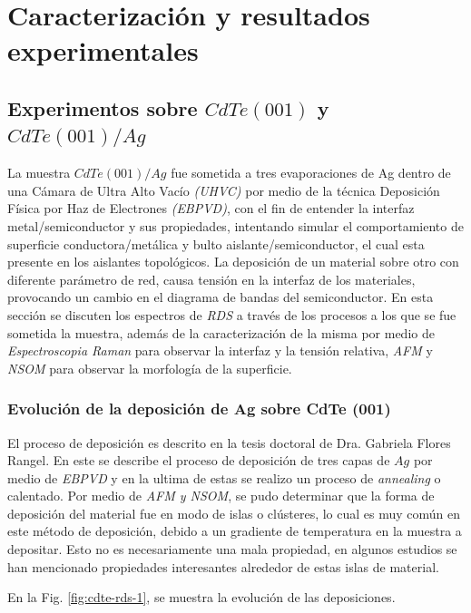 \chapter{Caracterización y resultados experimentales}
\label{chap:results}
\textit{}
\vfill
\minitoc
\newpage

\section{Experimentos sobre $ CdTe(001) $ y $ CdTe(001)/Ag $}
\label{sec:chap4-cdte}

La muestra $ CdTe(001)/Ag $ fue sometida a tres evaporaciones de Ag dentro de una Cámara de Ultra Alto Vacío 
\textit{(UHVC)} por medio de la técnica Deposición Física por Haz de Electrones \textit{(EBPVD)}, con el fin de entender la interfaz metal/semiconductor y sus propiedades, intentando simular el comportamiento de superficie conductora/metálica y bulto aislante/semiconductor, el cual esta presente en los aislantes topológicos. La deposición de un material sobre otro con diferente parámetro de red, causa tensión en la interfaz de los materiales, provocando un cambio en el diagrama de bandas del semiconductor.
En esta sección se discuten los espectros de \textit{RDS} a través de los procesos a los que se fue sometida la muestra, además de la caracterización de la misma por medio de \textit{Espectroscopia Raman} para observar la interfaz y la tensión relativa, \textit{AFM} y \textit{NSOM} para observar la morfología de la superficie.

\subsection{Evolución de la deposición de Ag sobre CdTe (001)}
\label{sec:chap4-cdte-rds}
El proceso de deposición es descrito en la tesis doctoral de Dra. Gabriela Flores Rangel\cite{PdHGaby}. En este se describe el proceso de deposición de tres capas de $Ag$ por medio de \textit{EBPVD} y en la ultima de estas se realizo un proceso de \textit{annealing} o calentado. Por medio de \textit{AFM y NSOM}, se pudo determinar que la forma de deposición del material fue en modo de islas o clústeres, lo cual es muy común en este método de deposición, debido a un gradiente de temperatura en la muestra a depositar. Esto no es necesariamente una mala propiedad, en algunos estudios se han mencionado propiedades interesantes alrededor de estas islas de material.\cite{Zhou2018}\cite{Bihlmayer2006} 

En la Fig. \ref{fig:cdte-rds-1}, se muestra la evolución de las deposiciones.

